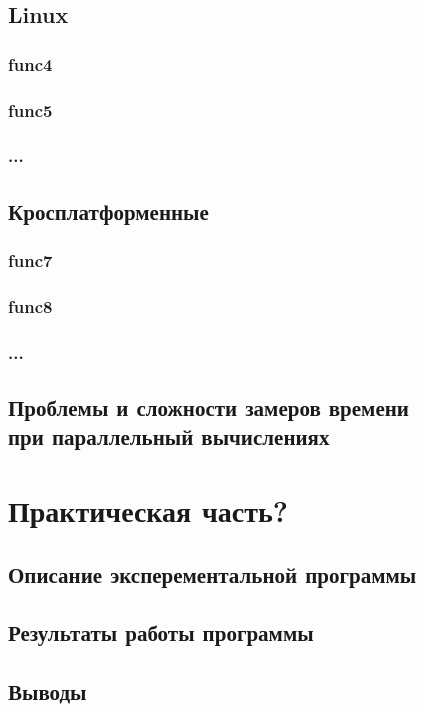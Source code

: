\documentclass{article}
\begin{document}
		\subsection{Linux}
			\subsubsection{func4}
			\subsubsection{func5}
			\subsubsection{...}
	\newpage
		\subsection{Кросплатформенные}
			\subsubsection{func7}
			\subsubsection{func8}
			\subsubsection{...}
		\subsection{Проблемы и сложности замеров времени \\ при параллельный вычислениях}
	\newpage
	\section{Практическая часть?}
		\subsection{Описание эксперементальной программы}
		\subsection{Результаты работы программы}
		\subsection{Выводы}
	\newpage
\end{document}
